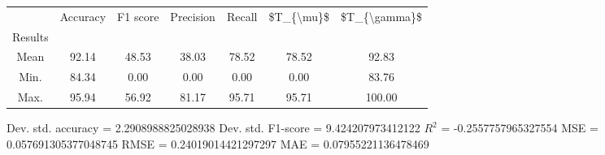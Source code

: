 \begin{tabular}{|c|c|c|c|c|c|c|}
\toprule
{} &  Accuracy &  F1 score &  Precision &  Recall &  \$T\_\{\textbackslash mu\}\$ &  \$T\_\{\textbackslash gamma\}\$ \\
Results &           &           &            &         &            &               \\
\hline
Mean    &     92.14 &     48.53 &      38.03 &   78.52 &      78.52 &         92.83 \\
Min.    &     84.34 &      0.00 &       0.00 &    0.00 &       0.00 &         83.76 \\
Max.    &     95.94 &     56.92 &      81.17 &   95.71 &      95.71 &        100.00 \\
\bottomrule
\end{tabular}

 Dev. std. accuracy = 2.2908988825028938
 Dev. std. F1-score = 9.424207973412122
 $R^2$ = -0.2557757965327554
 MSE = 0.057691305377048745
 RMSE = 0.24019014421297297
 MAE = 0.07955221136478469